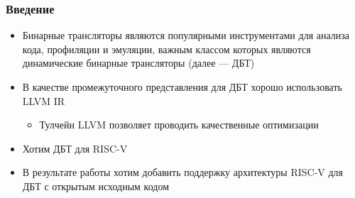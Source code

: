 \documentclass{beamer}
\begin{document}
\begin{frame}[fragile]
  \frametitle{Введение}
  \begin{itemize}
    \item Бинарные трансляторы являются популярными инструментами для анализа кода, профиляции и эмуляции, важным классом которых являются динамические бинарные трансляторы (далее --- ДБТ)
    \item В качестве промежуточного представления для ДБТ хорошо использовать LLVM IR
          \begin{itemize}
            \item Тулчейн LLVM позволяет проводить качественные оптимизации
          \end{itemize}
    \item Хотим ДБТ для RISC-V
    \item В результате работы хотим добавить поддержку архитектуры RISC-V для ДБТ с открытым исходным кодом
  \end{itemize}
\end{frame}


\end{document}
